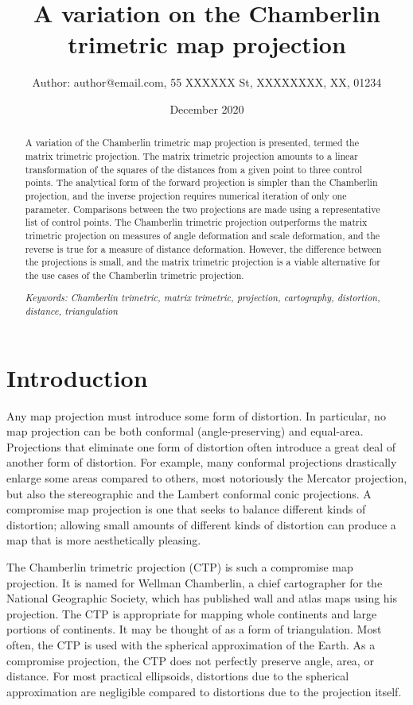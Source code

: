 \documentclass[]{interact}
\title{A variation on the Chamberlin trimetric map projection}
\author{Author: author@email.com, 55 XXXXXX St, XXXXXXXX, XX, 01234}
\date{December 2020}
\begin{document}
\maketitle
\begin{abstract}%
   A variation of the Chamberlin trimetric map projection is presented,
   termed the matrix trimetric projection. The matrix trimetric projection
   amounts to a linear transformation of the squares of the distances from a
   given point to three control points. The analytical form of the forward
   projection is simpler than the Chamberlin projection, and the inverse
   projection requires numerical iteration of only one parameter. Comparisons
   between the two projections are made using a representative list of control
   points. The Chamberlin trimetric projection outperforms the matrix trimetric
   projection on measures of angle deformation and scale deformation,
   and the reverse is true for a measure of distance deformation. However,
   the difference between the projections is small,
   and the matrix trimetric projection is a viable
   alternative for the use cases of the Chamberlin trimetric projection.

   \textit{Keywords: Chamberlin trimetric, matrix trimetric, projection,
   cartography, distortion, distance, triangulation}

\end{abstract}

\section{Introduction}
Any map projection must introduce some form of distortion. In particular, no
map projection can be both conformal (angle-preserving) and equal-area.
Projections that eliminate one form of distortion often introduce a great deal
of another form of distortion. For example, many conformal projections
drastically enlarge some areas compared to others, most notoriously the Mercator
projection, but also the stereographic and the Lambert conformal conic
projections. \citep{snyder87} A compromise map projection is one that seeks to
balance different kinds of distortion; allowing small amounts of different kinds
of distortion can produce a map that is more aesthetically pleasing.

The Chamberlin trimetric projection (CTP) is such a compromise map projection.
It is named for Wellman Chamberlin, a chief cartographer for the National
Geographic Society, which has published wall and atlas maps using his
projection. The CTP is appropriate for mapping whole continents and large
portions of continents. \citep{christensen} It may be thought of as a form of
triangulation. Most often, the CTP is used with the
spherical approximation of the Earth. As a compromise projection, the CTP does
not perfectly preserve angle, area, or distance. For most practical ellipsoids,
distortions due to the spherical approximation are negligible compared to
distortions due to the projection itself.
\end{document}
